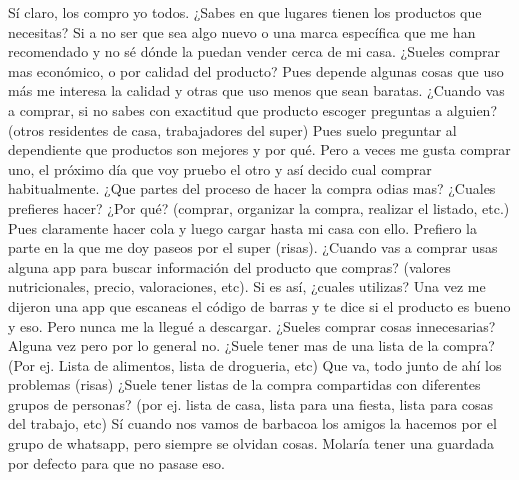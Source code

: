 \begin{description}
    \resp  Sí claro, los compro yo todos.
    \preg ¿Sabes en que lugares tienen los productos que necesitas?
    \resp  Si a no ser que sea algo nuevo o una marca específica que me han recomendado y no sé dónde la puedan vender cerca de mi casa.
    \preg ¿Sueles comprar mas económico, o por calidad del producto?
    \resp  Pues depende algunas cosas que uso más me interesa la calidad y otras que uso menos que sean baratas.
    \preg ¿Cuando vas a comprar, si no sabes con exactitud que producto escoger preguntas a alguien? (otros residentes de casa, trabajadores del super)
    \resp  Pues suelo preguntar al dependiente que productos son mejores y por qué. Pero a veces me gusta comprar uno, el próximo día que voy pruebo el otro y así decido cual comprar habitualmente.
    \preg ¿Que partes del proceso de hacer la compra odias mas? ¿Cuales prefieres hacer? ¿Por qué? (comprar, organizar la compra, realizar el listado, etc.)
    \resp  Pues claramente hacer cola y luego cargar hasta mi casa con ello. Prefiero la parte en la que me doy paseos por el super (risas).
    \preg ¿Cuando vas a comprar usas alguna app para buscar información del producto que compras? (valores nutricionales, precio, valoraciones, etc). Si es así, ¿cuales utilizas?
    \resp  Una vez me dijeron una app que escaneas el código de barras y te dice si el producto es bueno y eso. Pero nunca me la llegué a descargar.
    \preg ¿Sueles comprar cosas innecesarias?
    \resp  Alguna vez pero por lo general no.
    \preg ¿Suele tener mas de una lista de la compra? (Por ej. Lista de alimentos, lista de drogueria, etc) 
    \resp  Que va, todo junto de ahí los problemas (risas)
    \preg ¿Suele tener listas de la compra compartidas con diferentes grupos de personas? (por ej. lista de casa, lista para una fiesta, lista para cosas del trabajo, etc)
    \resp  Sí cuando nos vamos de barbacoa los amigos la hacemos por el grupo de whatsapp, pero siempre se olvidan cosas. Molaría tener una guardada por defecto para que no pasase eso.
\end{description}
